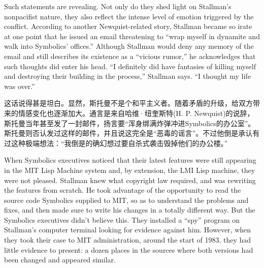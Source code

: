 \ifdefined\eng
Such statements are revealing. Not only do they shed light on Stallman's nonpacifist nature, they also reflect the intense level of emotion triggered by the conflict. According to another Newquist-related story, Stallman became so irate at one point that he issued an email threatening to ``wrap myself in dynamite and walk into Symbolics' offices.'' Although Stallman would deny any memory of the email and still describes its existence as a ``vicious rumor,'' he acknowledges that such thoughts did enter his head. ``I definitely did have fantasies of killing myself and destroying their building in the process,'' Stallman says. ``I thought my life was over.''
\fi

\ifdefined\chs
这话说得甚是坦白。显然，斯托曼不是个和平主义者。随着矛盾的升级，给双方带来的情感变化也逐渐加大。通言是来自哈维·纽奎斯特(H. P. Newquist)的说辞，斯托曼当年甚至发了一封邮件，扬言要``浑身绑满炸弹冲进Symbolics的办公室''。斯托曼则否认发过这样的邮件，并且说这完全是``恶毒的谣言''。不过他倒是承认有过这种极端想法：``我倒是的确幻想过要自杀式袭击毁掉他们的办公楼。''
\fi
\fi

\ifdefined\vtwo
\ifdefined\eng
When Symbolics executives noticed that their latest features were still appearing in the MIT Lisp Machine system and, by extension, the LMI Lisp machine, they were not pleased. Stallman knew what copyright law required, and was rewriting the features from scratch.  He took advantage of the opportunity to read the source code Symbolics supplied to MIT, so as to understand the problems and fixes, and then made sure to write his changes in a totally different way.  But the Symbolics executives didn't believe this.  They installed a ``spy'' program on Stallman's computer terminal looking for evidence against him.  However, when they took their case to MIT administration, around the start of 1983, they had little evidence to present: a dozen places in the sources where both versions had been changed and appeared similar.
\fi

